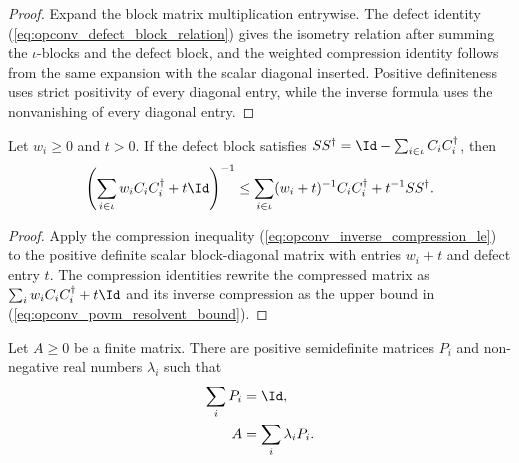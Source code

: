 \begin{proof}
    \leanok
    Expand the block matrix multiplication entrywise. The defect identity
    (\ref{eq:opconv_defect_block_relation}) gives the isometry relation after
    summing the $\iota$-blocks and the defect block, and the weighted
    compression identity follows from the same expansion with the scalar
    diagonal inserted. Positive definiteness uses strict positivity of every
    diagonal entry, while the inverse formula uses the nonvanishing of every
    diagonal entry.
\end{proof}

\begin{lemma}\label{lem:operator_jensen_povm_resolvent}
    \leanok
    Let $w_i\ge0$ and $t>0$. If the defect block satisfies
    $SS^\dagger=\Id-\sum_{i\in\iota}C_iC_i^\dagger$, then
    \begin{align}
        \left(\sum_{i\in\iota}w_iC_iC_i^\dagger+t\Id\right)^{-1}
        \le
        \sum_{i\in\iota}(w_i+t)^{-1}C_iC_i^\dagger+t^{-1}SS^\dagger.
        \label{eq:opconv_povm_resolvent_bound}
    \end{align}
\end{lemma}

\begin{proof}
    \leanok
    Apply the compression inequality
    (\ref{eq:opconv_inverse_compression_le}) to the positive definite
    scalar block-diagonal matrix with entries $w_i+t$ and defect entry $t$.
    The compression identities rewrite the compressed matrix as
    $\sum_iw_iC_iC_i^\dagger+t\Id$ and its inverse compression as the upper
    bound in (\ref{eq:opconv_povm_resolvent_bound}).
\end{proof}

\begin{lemma}\label{lem:operator_jensen_spectral_resolution}
    \leanok
    Let $A\ge0$ be a finite matrix. There are positive semidefinite matrices
    $P_i$ and non-negative real numbers $\lambda_i$ such that
    \begin{align}
        \sum_iP_i&=\Id, \notag\\
        A&=\sum_i\lambda_iP_i.
        \notag
    \end{align}
\end{lemma}

